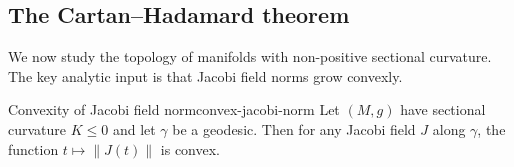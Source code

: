 









\subsection{The Cartan--Hadamard theorem}

We now study the topology of manifolds with non-positive sectional curvature. The key analytic input is that Jacobi field norms grow convexly.

\begin{colortheo}{Convexity of Jacobi field norm}{convex-jacobi-norm}
Let $(M, g)$ have sectional curvature $K \leqslant 0$ and let $\gamma$ be a geodesic. Then for any Jacobi field $J$ along $\gamma$, the function $t \mapsto \|J(t)\|$ is convex.
\end{colortheo}


